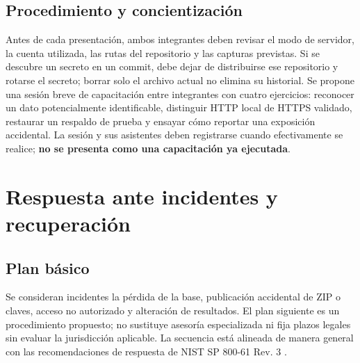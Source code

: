 \documentclass[12pt,a4paper]{article}
\begin{document}
\subsection{Procedimiento y concientización}
Antes de cada presentación, ambos integrantes deben revisar el modo de servidor, la cuenta utilizada, las rutas del repositorio y las capturas previstas. Si se descubre un secreto en un commit, debe dejar de distribuirse ese repositorio y rotarse el secreto; borrar solo el archivo actual no elimina su historial. Se propone una sesión breve de capacitación entre integrantes con cuatro ejercicios: reconocer un dato potencialmente identificable, distinguir HTTP local de HTTPS validado, restaurar un respaldo de prueba y ensayar cómo reportar una exposición accidental. La sesión y sus asistentes deben registrarse cuando efectivamente se realice; \textbf{no se presenta como una capacitación ya ejecutada}.

\section{Respuesta ante incidentes y recuperación}
\subsection{Plan básico}
Se consideran incidentes la pérdida de la base, publicación accidental de ZIP o claves, acceso no autorizado y alteración de resultados. El plan siguiente es un procedimiento propuesto; no sustituye asesoría especializada ni fija plazos legales sin evaluar la jurisdicción aplicable. La secuencia está alineada de manera general con las recomendaciones de respuesta de NIST SP 800-61 Rev. 3 \cite{nistir}.
\end{document}
